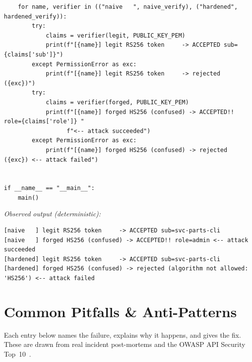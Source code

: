 \begin{verbatim}
    for name, verifier in (("naive   ", naive_verify), ("hardened", hardened_verify)):
        try:
            claims = verifier(legit, PUBLIC_KEY_PEM)
            print(f"[{name}] legit RS256 token     -> ACCEPTED sub={claims['sub']}")
        except PermissionError as exc:
            print(f"[{name}] legit RS256 token     -> rejected ({exc})")
        try:
            claims = verifier(forged, PUBLIC_KEY_PEM)
            print(f"[{name}] forged HS256 (confused) -> ACCEPTED!! role={claims['role']} "
                  f"<-- attack succeeded")
        except PermissionError as exc:
            print(f"[{name}] forged HS256 (confused) -> rejected ({exc}) <-- attack failed")


if __name__ == "__main__":
    main()
\end{verbatim}
\noindent\emph{Observed output (deterministic):}
\begin{verbatim}
[naive   ] legit RS256 token     -> ACCEPTED sub=svc-parts-cli
[naive   ] forged HS256 (confused) -> ACCEPTED!! role=admin <-- attack succeeded
[hardened] legit RS256 token     -> ACCEPTED sub=svc-parts-cli
[hardened] forged HS256 (confused) -> rejected (algorithm not allowed: 'HS256') <-- attack failed
\end{verbatim}

\section{Common Pitfalls \& Anti-Patterns}
\label{sec:ch5-pitfalls}

Each entry below names the failure, explains why it happens, and gives the
fix. These are drawn from real incident post-mortems and the OWASP API
Security Top~10~\cite{owaspapisecurity}.

